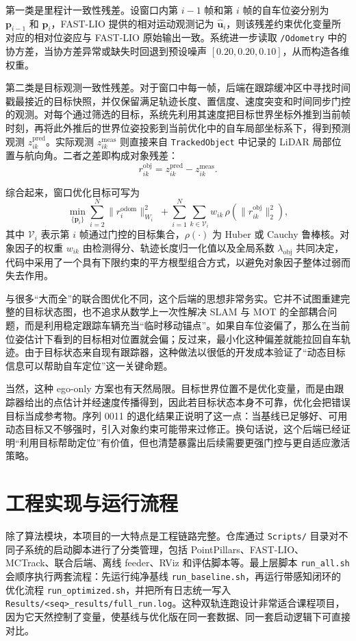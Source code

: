 \documentclass[UTF8,a4paper,12pt]{ctexart}
\begin{document}
第一类是里程计一致性残差。设窗口内第 \(i-1\) 帧和第 \(i\) 帧的自车位姿分别为 \(\mathbf{p}_{i-1}\) 和 \(\mathbf{p}_{i}\)，FAST-LIO 提供的相对运动观测记为 \(\hat{\mathbf{u}}_i\)，则该残差约束优化变量所对应的相对位姿应与 FAST-LIO 原始输出一致。系统进一步读取 \texttt{/Odometry} 中的协方差，当协方差异常或缺失时回退到预设噪声 \([0.20,0.20,0.10]\)，从而构造各维权重。

第二类是目标观测一致性残差。对于窗口中每一帧，后端在跟踪缓冲区中寻找时间戳最接近的目标快照，并仅保留满足轨迹长度、置信度、速度突变和时间同步门控的观测。对每个通过筛选的目标，系统先利用其速度把目标世界坐标外推到当前帧时刻，再将此外推后的世界位姿投影到当前优化中的自车局部坐标系下，得到预测观测 \(z^{\mathrm{pred}}_{ik}\)。实际观测 \(z^{\mathrm{meas}}_{ik}\) 则直接来自 \texttt{TrackedObject} 中记录的 LiDAR 局部位置与航向角。二者之差即构成对象残差：
\begin{equation}
r^{\mathrm{obj}}_{ik}=z^{\mathrm{pred}}_{ik}-z^{\mathrm{meas}}_{ik}.
\end{equation}

综合起来，窗口优化目标可写为
\begin{equation}
\min_{\{\mathbf{p}_i\}}
\sum_{i=2}^{N}\|r^{\mathrm{odom}}_i\|_{W_i}^2
\;+\sum_{i=1}^{N}\sum_{k\in\mathcal{V}_i}
w_{ik}\,\rho\!\left(\|r^{\mathrm{obj}}_{ik}\|_2^2\right),
\end{equation}
其中 \(\mathcal{V}_i\) 表示第 \(i\) 帧通过门控的目标集合，\(\rho(\cdot)\) 为 Huber 或 Cauchy 鲁棒核。对象因子的权重 \(w_{ik}\) 由检测得分、轨迹长度归一化值以及全局系数 \(\lambda_{\mathrm{obj}}\) 共同决定，代码中采用了一个具有下限约束的平方根型组合方式，以避免对象因子整体过弱而失去作用。

与很多“大而全”的联合图优化不同，这个后端的思想非常务实。它并不试图重建完整的目标状态图，也不追求从数学上一次性解决 SLAM 与 MOT 的全部耦合问题，而是利用稳定跟踪车辆充当“临时移动锚点”。如果自车位姿偏了，那么在当前位姿估计下看到的目标相对位置就会偏；反过来，最小化这种偏差就能拉回自车轨迹。由于目标状态来自现有跟踪器，这种做法以很低的开发成本验证了“动态目标信息可以帮助自车定位”这一关键命题。

当然，这种 ego-only 方案也有天然局限。目标世界位置不是优化变量，而是由跟踪器给出的点估计并经速度传播得到，因此若目标状态本身不可靠，优化会把错误目标当成参考物。序列 0011 的退化结果正说明了这一点：当基线已足够好、可用动态目标又不够强时，引入对象约束可能带来过修正。换句话说，这个后端已经证明“利用目标帮助定位”有价值，但也清楚暴露出后续需要更强门控与更自适应激活策略。

\section{工程实现与运行流程}
除了算法模块，本项目的一大特点是工程链路完整。仓库通过 \texttt{Scripts/} 目录对不同子系统的启动脚本进行了分类管理，包括 PointPillars、FAST-LIO、MCTrack、联合后端、离线 feeder、RViz 和评估脚本等。最上层脚本 \texttt{run\_all.sh} 会顺序执行两套流程：先运行纯净基线 \texttt{run\_baseline.sh}，再运行带感知闭环的优化流程 \texttt{run\_optimized.sh}，并把所有日志统一写入 \texttt{Results/<seq>\_results/full\_run.log}。这种双轨连跑设计非常适合课程项目，因为它天然控制了变量，使基线与优化版在同一套数据、同一套启动逻辑下可直接对比。
\end{document}
